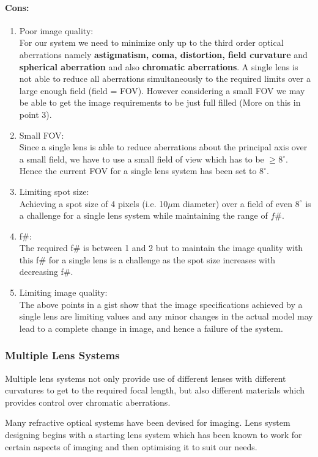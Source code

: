 \documentclass[../../main.tex]{subfiles}
\begin{document}
\paragraph{Cons:}
\begin{enumerate}
    \item Poor image quality:
    \\For our system we need to minimize only up to the third order optical aberrations namely \textbf{astigmatism, coma, distortion, field curvature }and \textbf{spherical aberration} and also \textbf{chromatic aberrations}. A single lens is not able to reduce all aberrations simultaneously to the required limits over a large enough field (field = FOV). However considering a small FOV we may be able to get the image requirements to be just full filled (More on this in point 3).
    \item Small FOV:
    \\Since a single lens is able to reduce aberrations about the principal axis over a small field, we have to use a small field of view which has to be $\geq8^{\circ}$. Hence the current FOV for a single lens system has been set to $8^{\circ}$.
    \item Limiting spot size:
    \\Achieving a spot size of 4 pixels (i.e. 10$\mu$m diameter) over a field of even $8^{\circ}$ is a challenge for a single lens system while maintaining the range of $f\#$.
    \item f\#:
    \\The required f\# is between 1 and 2 but to maintain the image quality with this f\# for a single lens is a challenge as the spot size increases with decreasing f\#.
    \item Limiting image quality:
    \\The above points in a gist show that the image specifications achieved by a single lens are limiting values and any minor changes in the actual model may lead to a complete change in image, and hence a failure of the system.
\end{enumerate}
\subsubsection{Multiple Lens Systems}
Multiple lens systems not only provide  use of different lenses with different curvatures to get to the required focal length, but also different materials which provides control over chromatic aberrations.

Many refractive optical systems have been devised for imaging. Lens system designing begins with a starting lens system which has been known to work for certain aspects of imaging and then optimising it to suit our needs.
\end{document}
